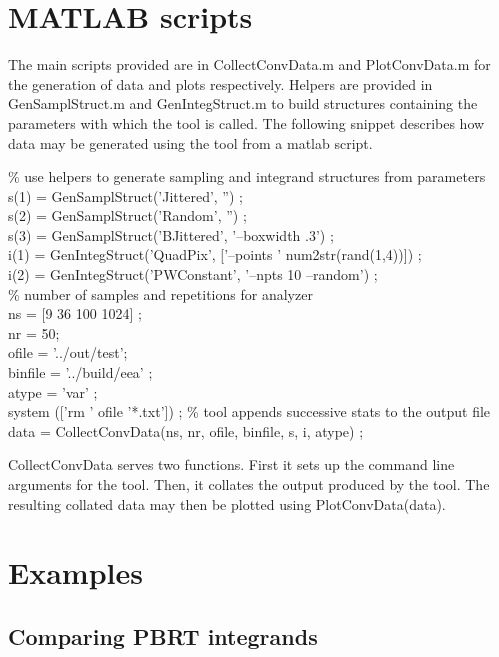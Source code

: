 \section{MATLAB scripts}
The main scripts provided are in CollectConvData.m and PlotConvData.m for the generation of data and plots respectively. Helpers are provided in GenSamplStruct.m  and GenIntegStruct.m to build structures containing the parameters with which the tool is called. The following snippet describes how data may be generated using the tool from a matlab script. 
\begin{tcolorbox}
 \% use helpers to generate sampling and integrand structures from parameters\\
 s(1) = GenSamplStruct('Jittered', '') ; \\
 s(2) = GenSamplStruct('Random', '') ; \\
 s(3) = GenSamplStruct('BJittered', '--boxwidth .3') ; \\
 i(1) = GenIntegStruct('QuadPix', ['--points ' num2str(rand(1,4))]) ; \\
 i(2) = GenIntegStruct('PWConstant', '--npts 10 --random') ; \\
 \% number of samples and repetitions for analyzer \\
 ns = [9 36 100 1024] ;\\
 nr =  50;\\
 ofile = '../out/test';\\
 binfile = '../build/eea' ;\\
 atype = 'var' ;\\
 system (['rm ' ofile '*.txt']) ; \% tool appends successive stats to the output file \\
 data = CollectConvData(ns, nr, ofile, binfile, s, i, atype) ;
\end{tcolorbox}
CollectConvData serves two functions. First it sets up the command line arguments for the tool. Then, it collates the output produced by the tool. The resulting collated data may then be plotted using PlotConvData(data).



\section{Examples}

\subsection{Comparing PBRT integrands}


